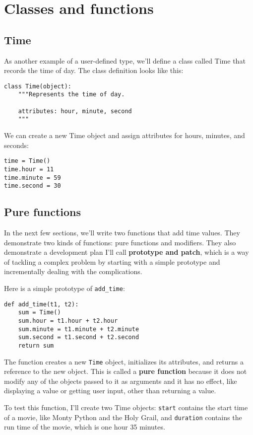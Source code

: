 \documentclass{article}
\begin{document}
\section{Classes and functions}
\begin{multicols}{2}
\subsection{Time}
As another example of a user-defined type, we'll define a class called Time
that records the time of day. The class definition looks like this:
\begin{lstlisting}
class Time(object):
    """Represents the time of day.

    attributes: hour, minute, second
    """
\end{lstlisting}
We can create a new Time object and assign attributes for hours, minutes, and
seconds:
\begin{lstlisting}
time = Time()
time.hour = 11
time.minute = 59
time.second = 30
\end{lstlisting}

\subsection{Pure functions}
In the next few sections, we’ll write two functions that add time values. They
demonstrate two kinds of functions: pure functions and modifiers. They also
demonstrate a development plan I’ll call \textbf{prototype and patch}, which is a way of
tackling a complex problem by starting with a simple prototype and
incrementally dealing with the complications.

Here is a simple prototype of \verb|add_time|:
\begin{lstlisting}
def add_time(t1, t2):
    sum = Time()
    sum.hour = t1.hour + t2.hour
    sum.minute = t1.minute + t2.minute
    sum.second = t1.second + t2.second
    return sum
\end{lstlisting}
The function creates a new \verb|Time| object, initializes its attributes,
and returns a reference to the new object. This is called a \textbf{pure
function} because it does not modify any of the objects passed to it as
arguments and it has no effect, like displaying a value or getting
user input, other than returning a value.

To test this function, I'll create two Time objects: \verb|start| contains
the start time of a movie, like Monty Python and the Holy Grail, and
\verb|duration| contains the run time of the movie, which is one hour 35
minutes.


\end{multicols}
\end{document}
